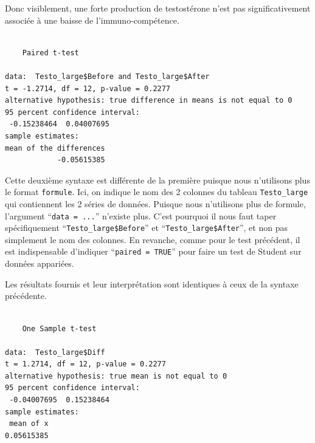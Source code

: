 \documentclass[a4paperpaper,]{article}
\newenvironment{Shaded}{\begin{snugshade}}{\end{snugshade}}
\newcommand{\CommentTok}[1]{\textcolor[rgb]{0.54,0.53,0.53}{#1}}
\newcommand{\DataTypeTok}[1]{\textcolor[rgb]{0.00,0.34,0.68}{#1}}
\newcommand{\DecValTok}[1]{\textcolor[rgb]{0.69,0.50,0.00}{#1}}
\newcommand{\KeywordTok}[1]{\textcolor[rgb]{0.12,0.11,0.11}{\textbf{#1}}}
\newcommand{\NormalTok}[1]{\textcolor[rgb]{0.12,0.11,0.11}{#1}}
\newcommand{\OperatorTok}[1]{\textcolor[rgb]{0.12,0.11,0.11}{#1}}
\newcommand{\OtherTok}[1]{\textcolor[rgb]{0.00,0.43,0.16}{#1}}
\begin{document}
Donc visiblement, une forte production de testostérone n'est pas significativement associée à une baisse de l'immuno-compétence.

\begin{Shaded}
\end{Shaded}

\begin{verbatim}

    Paired t-test

data:  Testo_large$Before and Testo_large$After
t = -1.2714, df = 12, p-value = 0.2277
alternative hypothesis: true difference in means is not equal to 0
95 percent confidence interval:
 -0.15238464  0.04007695
sample estimates:
mean of the differences 
            -0.05615385 
\end{verbatim}

Cette deuxième syntaxe est différente de la première puisque nous n'utilisons plus le format \texttt{formule}. Ici, on indique le nom des 2 colonnes du tableau \texttt{Testo\_large} qui contiennent les 2 séries de données. Puisque nous n'utilisons plus de formule, l'argument ``\texttt{data\ =\ ...}'' n'existe plus. C'est pourquoi il nous faut taper spécifiquement ``\texttt{Testo\_large\$Before}'' et ``\texttt{Testo\_large\$After}'', et non pas simplement le nom des colonnes. En revanche, comme pour le test précédent, il est indispensable d'indiquer ``\texttt{paired\ =\ TRUE}'' pour faire un test de Student sur données appariées.

Les résultats fournis et leur interprétation sont identiques à ceux de la syntaxe précédente.

\begin{Shaded}
\end{Shaded}

\begin{verbatim}

    One Sample t-test

data:  Testo_large$Diff
t = 1.2714, df = 12, p-value = 0.2277
alternative hypothesis: true mean is not equal to 0
95 percent confidence interval:
 -0.04007695  0.15238464
sample estimates:
 mean of x 
0.05615385 
\end{verbatim}
\end{document}
